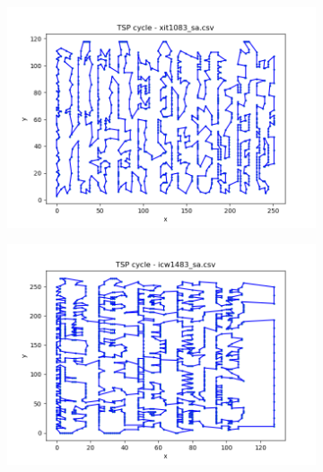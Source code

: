 \documentclass[12pt]{article}
\begin{document}
        \begin{figure}[htpb]
            \begin{subfigure}[b]{0.475\textwidth}
                \includegraphics[width=\linewidth]{img/xit1083_sa.png}
            \end{subfigure}
            \hfill
            \begin{subfigure}[b]{0.475\textwidth}
                \includegraphics[width=\linewidth]{img/icw1483_sa.png}
            \end{subfigure}
            \begin{subfigure}[b]{0.475\textwidth}

\end{subfigure}
\end{figure}
\end{document}
